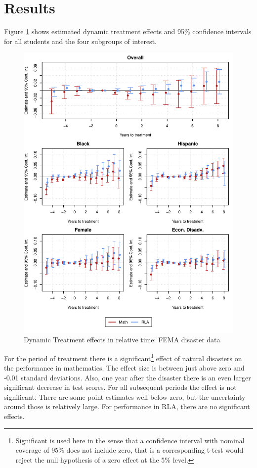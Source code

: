 \section{Results} \label{Results}

Figure \ref{ResultsPlot} shows estimated dynamic treatment effects and 95\% confidence intervals for all students and the four subgroups of interest. 

\begin{figure}[!h]
	\centering
	\includegraphics[scale=1]{"../Code & Data/ResultsPlot.pdf"}
	\caption{Dynamic Treatment effects in relative time: FEMA disaster data}
	\label{ResultsPlot}
\end{figure}


For the period of treatment there is a significant\footnote{Significant is used here in the sense that a confidence interval with nominal coverage of 95\% does not include zero, that is a corresponding t-test would reject the null hypothesis of a zero effect at the 5\% level.} effect of natural disasters on the performance in mathematics. The effect size is between just above zero and -0.01 standard deviations. Also, one year after the disaster there is an even larger significant decrease in test scores. For all subsequent periods the effect is not significant. There are some point estimates well below zero, but the uncertainty around those is relatively large. For performance in RLA, there are no significant effects.

